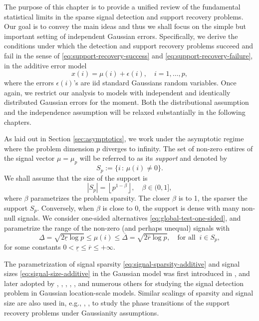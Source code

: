 
The purpose of this chapter is to provide a unified review of the fundamental statistical limits in the 
sparse signal detection and support recovery problems.  Our goal is to convey the main ideas and thus we shall focus on 
the simple but important setting of independent Gaussian errors.
Specifically, we derive the conditions under which the detection and support recovery problems succeed and fail in the sense of \eqref{eq:support-recovery-success} and \eqref{eq:support-recovery-failure}, in the additive error model 
\begin{equation} \label{eq:model-additive-Chapter3}
    x(i) = \mu(i) + \epsilon(i), \quad i=1,\ldots,p,
\end{equation}
where the errors $\epsilon(i)$'s are \ac{iid} standard Gaussians random variables.
Once again, we restrict our analysis to models with independent and identically distributed Gaussian errors for the 
moment. Both the distributional assumption and the independence assumption will be relaxed substantially in the following chapters.

As laid out in Section \ref{sec:asymptotics}, we work under the asymptotic regime where the problem dimension 
$p$ diverges to infinity.  The set of non-zero entires of the signal vector $\mu = \mu_p$ will be referred
to as its {\em support} and denoted by 
$$
 S_p:=\{i\, :\, \mu(i)\not = 0\}.
$$
We shall assume that the size of the support is
\begin{equation} \label{eq:signal-sparsity-additive}
    |S_p| = \left\lfloor p^{1-\beta} \right\rfloor, \quad \beta\in(0,1],
\end{equation}
where $\beta$ parametrizes the problem sparsity.
The closer $\beta$ is to 1, the sparser the support $S_p$.  
Conversely, when $\beta$ is close to 0, the support is dense with many non-null signals.
We consider one-sided alternatives \eqref{eq:global-test-one-sided}, and parametrize the range of the non-zero (and perhaps unequal) signals with
\begin{equation} \label{eq:signal-size-additive}
    \underline{\Delta} = \sqrt{2\underline{r}\log{p}}
    \le \mu(i) \le
    \overline{\Delta} = \sqrt{2\overline{r}\log{p}}, \quad \text{for all}\;\;i\in S_p,
\end{equation}
for some constants $0<\underline{r}\le\overline{r}\le+\infty$.

The parametrization of signal sparsity \eqref{eq:signal-sparsity-additive} and signal sizes \eqref{eq:signal-size-additive} in the Gaussian model was first introduced in \citet{ingster1998minimax}, and later adopted by \cite{hall2010innovated}, \cite{cai2011optimal}, \cite{zhong2013tests}, \cite{cai2014optimal}, \cite{arias2017distribution1}, and numerous others for studying the signal detection problem in Gaussian location-scale models.
Similar scalings of sparsity and signal size are also used in, e.g., \cite{ji2012ups}, \cite{jin2014optimality}, \cite{butucea2018variable} to study the phase transitions of the support recovery problems under Gaussianity assumptions. 

